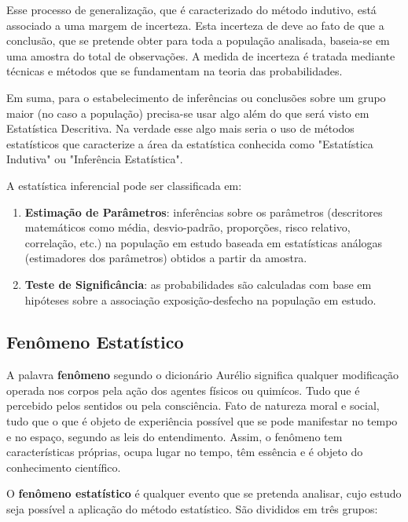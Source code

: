 Esse processo de generalização, que é caracterizado do método indutivo, está associado a uma margem de incerteza. Esta incerteza de deve ao fato de que a conclusão, que se pretende obter para toda a população analisada, baseia-se em uma amostra do total de observações. A medida de incerteza é tratada mediante técnicas e métodos que se fundamentam na teoria das probabilidades.\vskip0.3cm


Em suma, para o estabelecimento de inferências ou conclusões sobre um grupo maior (no caso a população) precisa-se usar algo além do que será visto em Estatística Descritiva. Na verdade esse algo mais seria o uso de métodos estatísticos que caracterize a área da estatística conhecida como "Estatística Indutiva" ou "Inferência Estatística".\vskip0.3cm

A estatística inferencial pode ser classificada em:

\begin{enumerate}
  \item \textbf{Estimação de Parâmetros}: inferências sobre os parâmetros (descritores matemáticos como média, desvio-padrão, proporções, risco relativo, correlação, etc.) na população em estudo baseada em estatísticas análogas (estimadores dos parâmetros) obtidos a partir da amostra.
  \item \textbf{Teste de Significância}: as probabilidades são calculadas com base em hi\-pó\-te\-ses sobre a associação exposição-desfecho na população em estudo.
\end{enumerate}


\subsection{Fenômeno Estatístico}

\inic A palavra \textbf{fenômeno} segundo o dicionário Aurélio significa qualquer modificação operada nos corpos pela ação dos agentes físicos ou quimícos. Tudo que é percebido pelos sentidos ou pela consciência. Fato de natureza moral e social, tudo que o que é objeto de experiência possível que se pode manifestar no tempo e no espaço, segundo as leis do entendimento. Assim, o fenômeno tem características próprias, ocupa lugar no tempo, têm essência e é objeto do conhecimento científico. \vskip0.3cm   

\inic O \textbf{fenômeno estatístico} é qualquer evento que se pretenda analisar, cujo estudo seja possível a aplicação do método estatístico. São divididos em três grupos:

